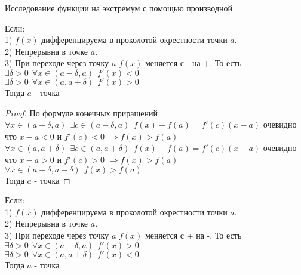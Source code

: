 \begin{title}[\Large]
  Исследование функции на экстремум с помощью производной
\end{title}

\begin{block}
  Если: \\
    1) $f(x)$ дифференцируема в проколотой окрестности точки $a$.\\
    2) Непрерывна в точке $a$.\\
    3) При переходе через точку $a$ $f(x)$ меняется с - на +. То есть\\
      $\exists \delta > 0 ~~ \forall x \in (a - \delta, a) ~~ f'(x) < 0$\\
      $\exists \delta > 0 ~~ \forall x \in (a, a + \delta) ~~ f'(x) > 0$\\
  Тогда $a$ - точка 
\end{block}

\begin{proof}
  По формуле конечных приращений\\
  $\forall x \in (a - \delta, a) ~~ \exists c \in (a - \delta, a) ~~
  f(x) - f(a) = f'(c)(x - a)$ очевидно что
  $x - a < 0$ и $f'(c) < 0$ $\Rightarrow f(x) > f(a)$\\
  $\forall x \in (a, a + \delta) ~~ \exists c \in (a, a + \delta) ~~
  f(x) - f(a) = f'(c)(x - a)$ очевидно что
  $x - a > 0$ и $f'(c) > 0$ $\Rightarrow f(x) > f(a)$\\
  $\forall x \in (a - \delta, a + \delta) ~~ f(x) > f(a)$\\
  Тогда $a$ - точка 
\end{proof}

\begin{block}
  Если: \\
    1) $f(x)$ дифференцируема в проколотой окрестности точки $a$.\\
    2) Непрерывна в точке $a$.\\
    3) При переходе через точку $a$ $f(x)$ меняется с + на -. То есть\\
      $\exists \delta > 0 ~~ \forall x \in (a - \delta, a) ~~ f'(x) > 0$\\
      $\exists \delta > 0 ~~ \forall x \in (a, a + \delta) ~~ f'(x) < 0$\\
  Тогда $a$ - точка 
\end{block}

